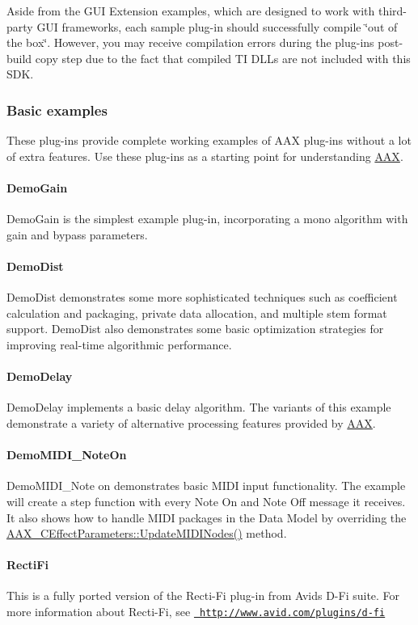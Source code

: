 Aside from the G\+UI Extension examples, which are designed to work with third-\/party G\+UI frameworks, each sample plug-\/in should successfully compile \char`\"{}out of the box\char`\"{}. However, you may receive compilation errors during the plug-\/ins\textquotesingle{} post-\/build copy step due to the fact that compiled TI D\+L\+Ls are not included with this S\+DK.\hypertarget{a00848_basic_examples}{}\subsubsection{Basic examples}\label{a00848_basic_examples}
These plug-\/ins provide complete working examples of A\+AX plug-\/ins without a lot of extra features. Use these plug-\/ins as a starting point for understanding \mbox{\hyperlink{a00852}{A\+AX}}.\hypertarget{a00848_DemoGain}{}\paragraph{Demo\+Gain}\label{a00848_DemoGain}
Demo\+Gain is the simplest example plug-\/in, incorporating a mono algorithm with gain and bypass parameters.\hypertarget{a00848_DemoDist}{}\paragraph{Demo\+Dist}\label{a00848_DemoDist}
Demo\+Dist demonstrates some more sophisticated techniques such as coefficient calculation and packaging, private data allocation, and multiple stem format support. Demo\+Dist also demonstrates some basic optimization strategies for improving real-\/time algorithmic performance.\hypertarget{a00848_DemoDelay}{}\paragraph{Demo\+Delay}\label{a00848_DemoDelay}
Demo\+Delay implements a basic delay algorithm. The variants of this example demonstrate a variety of alternative processing features provided by \mbox{\hyperlink{a00852}{A\+AX}}.\hypertarget{a00848_DemoMIDI_NoteOn}{}\paragraph{Demo\+M\+I\+D\+I\+\_\+\+Note\+On}\label{a00848_DemoMIDI_NoteOn}
Demo\+M\+I\+D\+I\+\_\+\+Note on demonstrates basic M\+I\+DI input functionality. The example will create a step function with every Note On and Note Off message it receives. It also shows how to handle M\+I\+DI packages in the Data Model by overriding the \mbox{\hyperlink{a01481_aac6fa72278c0f46aa430cd79bdb2d767}{A\+A\+X\+\_\+\+C\+Effect\+Parameters\+::\+Update\+M\+I\+D\+I\+Nodes()}} method.\hypertarget{a00848_RectiFi}{}\paragraph{Recti\+Fi}\label{a00848_RectiFi}
This is a fully ported version of the Recti-\/\+Fi plug-\/in from Avid\textquotesingle{}s D-\/\+Fi suite. For more information about Recti-\/\+Fi, see \href{http://www.avid.com/plugins/d-fi}{\texttt{ http\+://www.\+avid.\+com/plugins/d-\/fi}}

